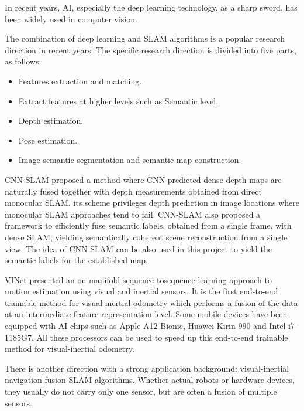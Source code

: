 In recent years, \ac{AI}, especially the deep learning technology, as a sharp sword, has been widely used in computer vision.

The combination of deep learning and \ac{SLAM} algorithms is a popular research direction in recent years. The specific research direction is divided into five parts, as follows:
\begin{itemize}
    \item Features extraction and matching.
    \item Extract features at higher levels such as Semantic level. 
    \item Depth estimation. 
    \item Pose estimation.
    \item Image semantic segmentation  and semantic map construction.
\end{itemize}

CNN-SLAM \parencite{8100178} proposed a method where CNN-predicted dense depth maps are naturally fused together with depth measurements obtained from direct monocular SLAM. its scheme privileges depth prediction in image locations where monocular SLAM approaches tend to fail. CNN-SLAM also proposed a framework to efficiently fuse semantic labels, obtained from a single frame, with dense SLAM, yielding semantically coherent scene reconstruction from a single view. The idea of CNN-SLAM can be also used in this project to yield the semantic labels for the established map.

VINet \parencite{article:AINet} presented an on-manifold sequence-tosequence learning approach to motion estimation using visual and inertial sensors. It is  the first end-to-end trainable method for visual-inertial odometry which performs a fusion of the data at an intermediate feature-representation level. Some mobile devices have been equipped with AI chips such as Apple A12 Bionic, Huawei Kirin 990 and Intel i7-1185G7. All these processors can be used to speed up this end-to-end trainable method for visual-inertial odometry.

There is another direction with a strong application background: visual-inertial navigation fusion SLAM algorithms. Whether actual robots or hardware devices, they usually do not carry only one sensor, but are often a fusion of multiple sensors.

